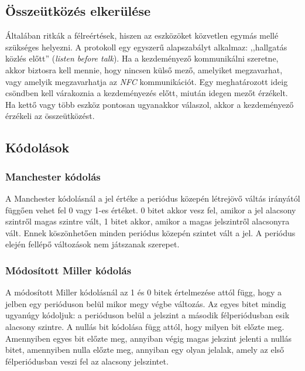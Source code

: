 \documentclass[12pt]{article}
\begin{document}
\subsection{Összeütközés elkerülése}
Általában ritkák a félreértések, hiszen az eszközöket közvetlen egymás mellé 
szükséges helyezni. A protokoll egy egyszerű alapszabályt alkalmaz: ,,hallgatás
közlés előtt'' (\emph{listen before talk}). Ha a kezdeményező kommunikálni szeretne,
akkor biztosra kell mennie, hogy nincsen külső mező, amelyiket megzavarhat,
vagy amelyik megzavarhatja az \emph{NFC} kommunikációt. Egy meghatározott 
ideig csöndben kell várakoznia a kezdeményezés előtt, miután idegen mezőt 
érzékelt. Ha kettő vagy több eszköz pontosan ugyanakkor válaszol, akkor a
kezdeményező érzékeli az összeütközést.

\subsection{Kódolások}

\subsubsection{Manchester kódolás}
A Manchester kódolásnál a jel értéke a periódus közepén létrejövő váltás irányától
függően vehet fel 0 vagy 1-es értéket. 0 bitet akkor vesz fel, amikor a jel
alacsony szintről magas szintre vált, 1 bitet akkor, amikor a magas jelszintről
alacsonyra vált. Ennek köszönhetően minden periódus közepén szintet vált a jel.
A periódus elején fellépő változások nem játszanak szerepet.

\subsubsection{Módosított Miller kódolás}
A módosított Miller kódolásnál az 1 és 0 bitek értelmezése attól függ, hogy
a jelben egy perióduson belül mikor megy végbe változás. Az egyes bitet
mindig ugyanúgy kódoljuk: a perióduson belül a jelszint a második félperiódusban
esik alacsony szintre. A nullás bit kódolása függ attól, hogy milyen bit előzte meg.
Amennyiben egyes bit előzte meg, annyiban végig magas jelszint jelenti a nullás
bitet, amennyiben nulla előzte meg, annyiban egy olyan jelalak, amely az első
félperiódusban veszi fel az alacsony jelszintet.
\end{document}
